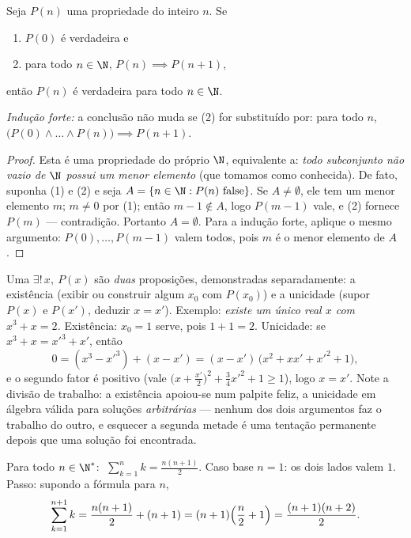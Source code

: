 \begin{theorem}[Indução]\label{thm:b1:logic:induction}
Seja $P(n)$ uma propriedade do inteiro $n$. Se
\begin{enumerate}
  \item $P(0)$ é verdadeira e
  \item para todo $n \in \N$, $P(n) \implies P(n+1)$,
\end{enumerate}
então $P(n)$ é verdadeira para todo $n \in \N$.

\emph{Indução forte:} a conclusão não muda se (2) for substituído por:
para todo $n$, $\bigl(P(0) \land \dots \land P(n)\bigr) \implies
P(n+1)$.
\end{theorem}

\begin{proof}
Esta é uma propriedade do próprio $\N$, equivalente a: \emph{todo
subconjunto não vazio de $\N$ possui um menor elemento} (que tomamos como
conhecida). De fato, suponha (1) e (2) e seja $A = \{n \in \N : P(n)
\text{ false}\}$. Se $A \neq \emptyset$, ele tem um menor elemento $m$;
$m \neq 0$ por (1); então $m - 1 \notin A$, logo $P(m-1)$ vale, e (2)
fornece $P(m)$ --- contradição. Portanto $A = \emptyset$. Para a indução
forte, aplique o mesmo argumento: $P(0), \dots, P(m-1)$ valem todos,
pois $m$ é o menor elemento de $A$.
\end{proof}

\begin{example}\label{ex:b1:logic:uniqueexistence}
Uma  $\exists!\,x,\ P(x)$ são \emph{duas} proposições, demonstradas
separadamente: a existência (exibir ou construir algum $x_0$ com
$P(x_0)$) e a unicidade (supor $P(x)$ e $P(x')$, deduzir $x =
x'$). Exemplo: \emph{existe um único real $x$ com $x^3 + x =
2$.}
Existência: $x_0 = 1$ serve, pois $1 + 1 = 2$. Unicidade:
se $x^3 + x = x'^3 + x'$, então
\[
0 = (x^3 - x'^3) + (x - x')
= (x - x')\,\bigl(x^2 + xx' + x'^2 + 1\bigr),
\]
e o segundo fator é positivo (vale $\bigl(x +
\tfrac{x'}2\bigr)^2 + \tfrac34 x'^2 + 1 \geq 1$), logo $x = x'$.
Note a divisão de trabalho: a existência apoiou-se num palpite feliz, a
unicidade em álgebra válida para soluções \emph{arbitrárias} --- nenhum
dos dois argumentos faz o trabalho do outro, e esquecer a segunda metade
é uma tentação permanente depois que uma solução foi encontrada.
\end{example}

\begin{example}\label{ex:b1:logic:induction}
Para todo $n \in \N^*$: $\;\sum_{k=1}^n k = \frac{n(n+1)}{2}$. Caso base
$n = 1$: os dois lados valem $1$. Passo: supondo a fórmula para $n$,
\[
\sum_{k=1}^{n+1} k = \frac{n(n+1)}{2} + (n+1)
= (n+1)\Bigl(\frac n2 + 1\Bigr) = \frac{(n+1)(n+2)}{2}. \qedhere
\]
\end{example}

